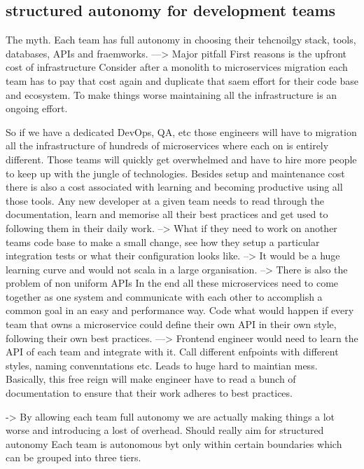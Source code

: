 \documentclass[a4paper, 11pt]{book}
\begin{document}
    \subsection{structured autonomy for development teams}
    The myth. Each team has full autonomy in choosing their tehcnoilgy stack, tools, databases, APIs and fraemworks.
    ---> Major pitfall
    First reasons is the upfront cost of infrastructure
    Consider after a monolith to microservices migration each team has to pay that cost again and duplicate that saem effort for their code base and ecosystem.
    To make things worse maintaining all the infrastructure is an ongoing effort.

    So if we have a dedicated DevOps, QA, etc those engineers will have to migration all the infrastructure of hundreds of microservices where each on is entirely different.
    Those teams will quickly get overwhelmed and have to hire more people to keep up with the jungle of technologies.
    Besides setup and maintenance cost there is also a cost associated with learning and becoming productive using all those tools.
    Any new developer at a given team needs to read through the documentation, learn and memorise all their best practices and get used to following them in their daily work.
    --> What if they need to work on another teams code base to make a small change, see how they setup a particular integration tests or what their configuration looks like.
    --> It would be a huge learning curve and would not scala in a large organisation.
    --> There is also the problem of non uniform APIs
    In the end all these microservices need to come together as one system and communicate with each other to accomplish a common goal in an easy and performance way.
    Code what would happen if every team that owns a microservice could define their own API in their own style, following their own best practices.
    ---> Frontend engineer would need to learn the API of each team and integrate with it. Call different enfpoints with different styles, naming convenntations etc. Leads to huge hard to maintian mess.
    Basically, this free reign will make engineer have to read a bunch of documentation to ensure that their work adheres to best practices.

    -> By allowing each team full autonomy we are actually making things a lot worse and introducing a lost of overhead.
    Should really aim for structured autonomy
    Each team is autonomous byt only within certain boundaries which can be grouped into three tiers.
\end{document}
